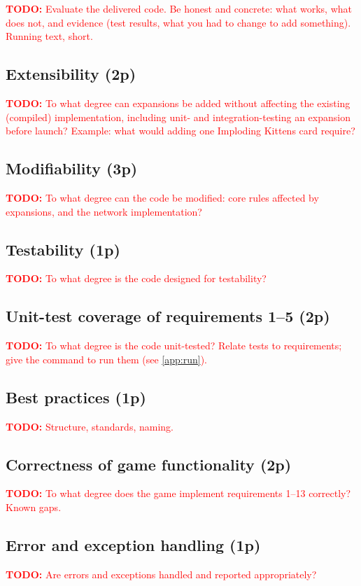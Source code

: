 \documentclass[12pt,a4paper]{article}
\newcommand{\todo}[1]{\textcolor{red}{\textbf{TODO:} #1}}   %
\begin{document}
\todo{Evaluate the delivered code. Be honest and concrete: what works, what does not,
and evidence (test results, what you had to change to add something). Running text,
short.}

\subsection{Extensibility (2p)}
\todo{To what degree can expansions be added without affecting the existing (compiled)
implementation, including unit- and integration-testing an expansion before launch?
Example: what would adding one Imploding Kittens card require?}

\subsection{Modifiability (3p)}
\todo{To what degree can the code be modified: core rules affected by expansions, and
the network implementation?}

\subsection{Testability (1p)}
\todo{To what degree is the code designed for testability?}

\subsection{Unit-test coverage of requirements 1--5 (2p)}
\todo{To what degree is the code unit-tested? Relate tests to requirements; give the
command to run them (see \cref{app:run}).}

\subsection{Best practices (1p)}
\todo{Structure, standards, naming.}

\subsection{Correctness of game functionality (2p)}
\todo{To what degree does the game implement requirements 1--13 correctly? Known gaps.}

\subsection{Error and exception handling (1p)}
\todo{Are errors and exceptions handled and reported appropriately?}
\end{document}
